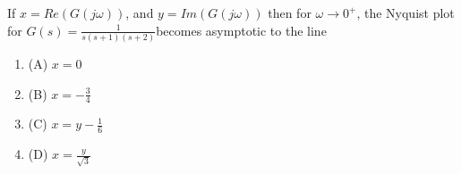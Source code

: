     \bigskip
    \item If $x = Re(G(j\omega))$, and $y = Im(G(j\omega))$ then for $ \omega \to 0^{+} $, the Nyquist plot for $G(s) = \frac{1}{s(s+1)(s+2)}$becomes asymptotic to the line
    \begin{multicols}{4}
    \begin{enumerate}
        \item (A) $x = 0$
        \item (B) $x = -\frac{3}{4}$
        \item (C) $x = y - \frac{1}{6}$
        \item (D) $x = \frac{y}{\sqrt{3}}$
    \end{enumerate}
    \end{multicols}
    \bigskip


